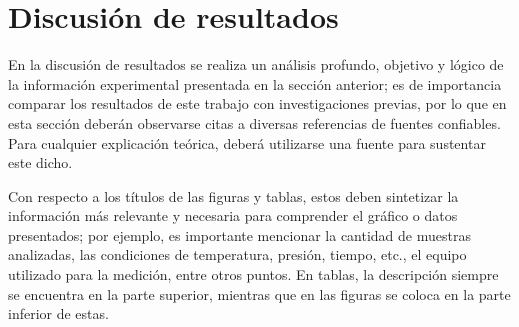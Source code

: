 \section{Discusión de resultados} %
\label{sec:discusion} %

En la discusión de resultados se realiza un análisis profundo, objetivo y lógico de la información experimental presentada en la sección anterior; es de importancia comparar los resultados de este trabajo con investigaciones previas, por lo que en esta sección deberán observarse citas a diversas referencias de fuentes confiables. Para cualquier explicación teórica, deberá utilizarse una fuente para sustentar este dicho.

Con respecto a los títulos de las figuras y tablas, estos deben sintetizar la información más relevante y necesaria para comprender el gráfico o datos presentados; por ejemplo, es importante mencionar la cantidad de muestras analizadas, las condiciones de temperatura, presión, tiempo, etc., el equipo utilizado para la medición, entre otros puntos. En tablas, la descripción siempre se encuentra en la parte superior, mientras que en las figuras se coloca en la parte inferior de estas.


